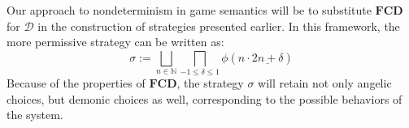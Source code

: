 \documentclass[sigplan,screen]{acmart}
\begin{document}
Our approach to nondeterminism in game semantics
will be to substitute $\mathbf{FCD}$ for $\mathcal{D}$
in the construction of strategies presented earlier. 
In this framework,
the more permissive strategy
can be written as:
\[
  \sigma :=
    \bigsqcup_{n \in \mathbb{N}}
    \bigsqcap_{-1 \le \delta \le 1}
    \phi(n \cdot \underline{2n + \delta})
\]
Because of the properties of $\mathbf{FCD}$,
the strategy $\sigma$ will retain
not only angelic choices,
but demonic choices as well,
corresponding to the possible behaviors
of the system.


%
%

\end{document}
